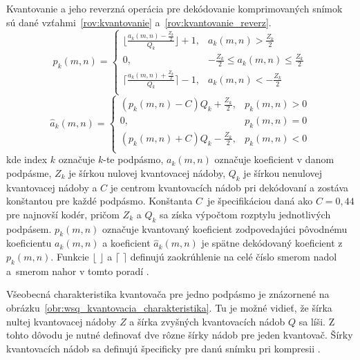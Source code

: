   Kvantovanie a jeho reverzná operácia pre dekódovanie komprimovaných snímok sú dané vzťahmi~{\ref{rov:kvantovanie}} a~{\ref{rov:kvantovanie_reverz}}.
  \begin{equation}
    p_k(m,n) =
    \begin{cases}
      \lfloor \frac{a_k(m,n) - \frac{Z_k}{2}}{Q_k} \rfloor + 1, & a_k(m,n) > \frac{Z_k}{2} \\
      0, & -\frac{Z_k}{2} \leq a_k(m,n) \leq \frac{Z_k}{2} \\
      \lceil \frac{a_k(m,n) + \frac{Z_k}{2} }{Q_k} \rceil - 1, & a_k(m,n) < -\frac{Z_k}{2} \\
    \end{cases}
    \label{rov:kvantovanie}
  \end{equation}
  \begin{equation}
    \hat{a}_k(m,n) = 
    \begin{cases}
      (p_k(m,n) - C)Q_k + \frac{Z_k}{2}, & p_k(m,n) > 0 \\
      0, & p_k(m,n) = 0 \\
      (p_k(m,n) + C)Q_k - \frac{Z_k}{2}, & p_k(m,n) < 0\\
    \end{cases}
    \label{rov:kvantovanie_reverz}
  \end{equation}
  kde index $k$ označuje $k$-te podpásmo, $a_k(m,n)$ označuje koeficient v danom podpásme, $Z_k$ je šírkou nulovej kvantovacej nádoby,
  $Q_k$ je šírkou nenulovej kvantovacej nádoby a $C$ je centrom kvantovacích nádob pri dekódovaní a zostáva konštantou pre každé podpásmo. Konštanta
  {$C$}~je špecifikáciou daná ako $C = 0,44$ pre najnovší kodér, pričom $Z_k$ a $Q_k$ sa získa výpočtom rozptylu jednotlivých podpásem. $p_k(m,n)$ označuje
  kvantovaný koeficient zodpovedajúci pôvodnému koeficientu $a_k(m,n)$ a koeficient $\hat{a}_k(m,n)$ je spätne dekódovaný koeficient z~{$p_k(m,n)$}.
  Funkcie $\lfloor$ $\rfloor$ a $\lceil$ $\rceil$ definujú zaokrúhlenie na celé číslo smerom nadol a~smerom nahor v tomto poradí \cite{WSQSpecification}.

  Všeobecná charakteristika kvantovača pre jedno podpásmo je znázornené na obrázku~{\ref{obr:wsq_kvantovacia_charakteristika}}. Tu je možné vidieť, že šírka
  nultej kvantovacej nádoby $Z$ a šírka zvyšných kvantovacích nádob $Q$ sa líši. Z tohto dôvodu je nutné definovať dve rôzne šírky nádob pre jeden kvantovač.
  Šírky kvantovacích nádob sa definujú špecificky pre danú snímku pri kompresii \cite{brislawn1996compression}.

